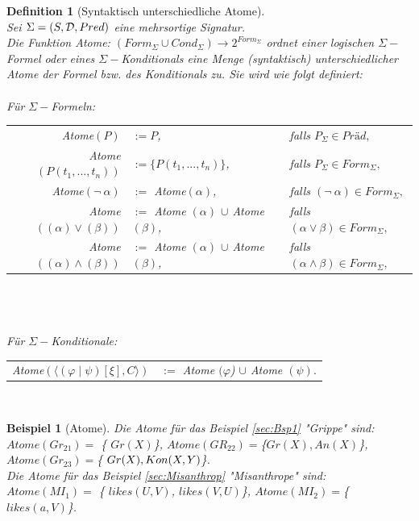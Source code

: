 \documentclass[a4paper, 11pt]{book}
\newtheorem{Def}{Definition }[section]
\newtheorem{Bsp}{Beispiel}[section]
\begin{document}
\begin{Def}[Syntaktisch unterschiedliche Atome]\cite[Kap. 6.2., \\S. 131/132, Def. 6.2.12]{Fis10}\\
Sei $ \Sigma = (S, {\cal D}, Pred) $ eine mehrsortige Signatur.\\
Die Funktion Atome: $ (Form_{\Sigma} \cup Cond_{\Sigma}) \rightarrow 2^{Form_{\Sigma}}$ ordnet einer logischen $ \Sigma- $Formel oder eines $ \Sigma- $Konditionals eine Menge (syntaktisch) unterschiedlicher Atome der Formel bzw. des Konditionals zu.
Sie wird wie folgt definiert:\\
\\Für $ \Sigma- $Formeln: 

\begin{tabular}{rll}
Atome$ (P) $ & $ := {P} $, & falls $ P_{\Sigma} \in Präd,$ \\
Atome$ (P(t_1, ..., t_n)) $ & $ := \{P(t_1, ..., t_n)\} $, & falls $ P_{\Sigma} \in Form_{\Sigma},$ \\
Atome$ (\neg ~ \alpha) $ & $ := $ Atome$ (\alpha) $, & falls $ (\neg ~ \alpha) \in Form_{\Sigma},$ \\
Atome$ ((\alpha) \vee (\beta)) $ & $ := $ Atome $ (\alpha) $  $ \cup$ Atome $ (\beta) $, & falls $ (\alpha \vee \beta) \in Form_{\Sigma},$ \\
Atome$ ((\alpha) \wedge (\beta)) $ & $ := $ Atome $ (\alpha) $  $ \cup$ Atome $ (\beta) $, & falls $ (\alpha \wedge \beta) \in Form_{\Sigma},$ \\
\end{tabular}\\ 
\\
\\
Für $ \Sigma- $Konditionale:

\begin{tabular}{rl}
Atome$(  \langle (\varphi \mid \psi)[\xi], C \rangle) $ & $ :=   $ Atome $ (\varphi$) $ \cup $  Atome $ (\psi ).$ \\
\end{tabular}
\\
\end{Def}


\begin{Bsp}[Atome]
Die Atome für das Beispiel \ref{sec:Bsp1} "{}Grippe"{}  sind:\\
$ Atome(Gr_{21}) = $  \{ $Gr(X) $\}, $ Atome(GR_{22}) = $\{$Gr(X), An(X)$\},  $Atome(Gr_{23}) = $\{ $Gr(X), \\ Kon(X, Y) $\}. \\

Die Atome für das Beispiel \ref{sec:Misanthrop} "{}Misanthrope"{} sind:\\
$ Atome(MI_{1}) = $  \{ $likes(U, V) $, $likes(V, U) $\}, $Atome(MI_{2}) = $\{ $likes(a, V)  $\}. \\
\\
\end{Bsp}
\end{document}
